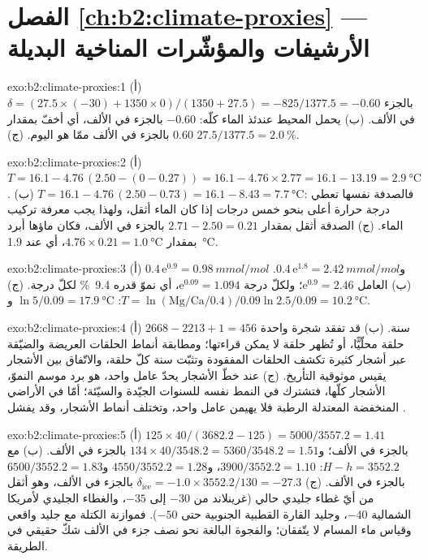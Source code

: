 \section*{الفصل \ref{ch:b2:climate-proxies} --- الأرشيفات والمؤشّرات المناخية البديلة}

\begin{solution}{exo:b2:climate-proxies:1}
(أ) $\delta = (27.5 \times (-30) + 1350 \times 0)/(1350 + 27.5) = -825/1377.5 = -0.60$ بالجزء في الألف.
(ب) يحمل المحيط عندئذ الماء كلّه: $-0.60$ بالجزء في الألف، أي أخفّ بمقدار \num{0.60} بالجزء في الألف ممّا هو
اليوم. (ج) $27.5/1377.5 = \qty{2.0}{\percent}$.
\end{solution}

\begin{solution}{exo:b2:climate-proxies:2}
(أ) $T = 16.1 - 4.76\,(2.50 - (0 - 0.27)) = 16.1 - 4.76 \times 2.77 = 16.1 - 13.19 =
\qty{2.9}{\celsius}$. (ب) $T = 16.1 - 4.76\,(2.50 - 0.73) = 16.1 - 8.43 = \qty{7.7}{\celsius}$: فالصدفة
نفسها تعطي درجة حرارة أعلى بنحو خمس درجات إذا كان الماء أثقل، ولهذا يجب
معرفة تركيب الماء. (ج) الصدفة أثقل بمقدار $2.71 - 2.50 = 0.21$ بالجزء في الألف،
فكان ماؤها أبرد بمقدار $4.76 \times 0.21 = \qty{1.0}{\celsius}$، أي عند \qty{1.9}{\celsius}.
\end{solution}

\begin{solution}{exo:b2:climate-proxies:3}
(أ) $0.4\,\mathrm{e}^{0.9} = \qty{0.98}{mmol/mol}$ و$0.4\,\mathrm{e}^{1.8} =
\qty{2.42}{mmol/mol}$. (ب) العامل $\mathrm{e}^{0.9} = 2.46$؛ ولكلّ درجة $\mathrm{e}^{0.09}
= 1.094$، أي نموّ قدره \qty{9.4}{\percent} لكلّ درجة. (ج) $T = \ln(\text{Mg/Ca}/0.4)/0.09$:
$\ln 5/0.09 = \qty{17.9}{\celsius}$ و$\ln 2.5/0.09 = \qty{10.2}{\celsius}$.
\end{solution}

\begin{solution}{exo:b2:climate-proxies:4}
(أ) $2668 - 2213 + 1 = 456$ سنة. (ب) قد تفقد شجرة واحدة حلقة محلّيًّا، أو تُظهر حلقة
لا يمكن قراءتها؛ ومطابقة أنماط الحلقات العريضة والضيّقة عبر أشجار كثيرة تكشف
الحلقات المفقودة وتثبّت سنة كلّ حلقة، والاتّفاق بين الأشجار يقيس
موثوقية التأريخ. (ج) عند خطّ الأشجار يحدّ عامل واحد، هو برد موسم النموّ،
الأشجار كلّها، فتشترك في النمط نفسه للسنوات الجيّدة والسيّئة؛ أمّا في الأراضي المنخفضة المعتدلة الرطبة
فلا يهيمن عامل واحد، وتختلف أنماط الأشجار، وقد يفشل .
\end{solution}

\begin{solution}{exo:b2:climate-proxies:5}
(أ) $125 \times 40/(3682.2 - 125) = 5000/3557.2 = 1.41$ بالجزء في الألف؛ و$134 \times 40/3548.2 =
5360/3548.2 = 1.51$ بالجزء في الألف. (ب) مع $H - h = 3552.2$: $3900/3552.2 = 1.10$، و$4550/3552.2 = 1.28$
و$6500/3552.2 = 1.83$ بالجزء في الألف. (ج) $\delta_{\mathrm{ice}} = -1.0 \times 3552.2/130 = -27.3$ بالجزء في
الألف، وهو أثقل من أيّ غطاء جليدي حالي (غرينلاند من $-30$ إلى $-35$، والغطاء الجليدي لأمريكا الشمالية
$-40$، وجليد القارة القطبية الجنوبية حتى $-50$). فموازنة الكتلة مع جليد واقعي وقياس ماء المسام
لا يتّفقان؛ والفجوة البالغة نحو نصف جزء في الألف شكّ حقيقي في الطريقة.
\end{solution}

